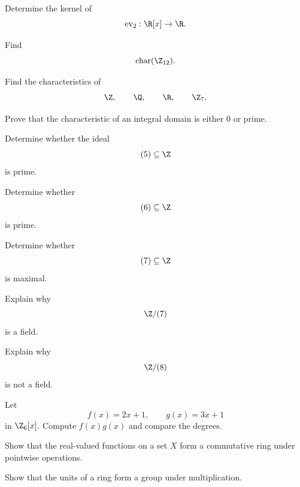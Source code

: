 \begin{exercise}[2]
Determine the kernel of
\[ \operatorname{ev}_2:\R[x]\to\R. \]
\end{exercise}

\begin{exercise}[2]
Find
\[ \operatorname{char}(\Z_{12}). \]
\end{exercise}

\begin{exercise}[2]
Find the characteristics of
\[ \Z,\qquad\Q,\qquad\R,\qquad\Z_7. \]
\end{exercise}

\begin{exercise}[3]
Prove that the characteristic of an integral domain is either \(0\) or prime.
\end{exercise}

\begin{exercise}[2]
Determine whether the ideal
\[ (5)\subseteq\Z \]
is prime.
\end{exercise}

\begin{exercise}[2]
Determine whether
\[ (6)\subseteq\Z \]
is prime.
\end{exercise}

\begin{exercise}[2]
Determine whether
\[ (7)\subseteq\Z \]
is maximal.
\end{exercise}

\begin{exercise}[2]
Explain why
\[ \Z/(7) \]
is a field.
\end{exercise}

\begin{exercise}[2]
Explain why
\[ \Z/(8) \]
is not a field.
\end{exercise}

\begin{exercise}[2]
Let
\[ f(x)=2x+1,\qquad g(x)=3x+1 \]
in \(\Z_6[x]\). Compute \(f(x)g(x)\) and compare the degrees.
\end{exercise}

\begin{exercise}[2]
Show that the real-valued functions on a set \(X\) form a commutative ring
under pointwise operations.
\end{exercise}

\begin{exercise}[3]
Show that the units of a ring form a group under multiplication.
\end{exercise}


